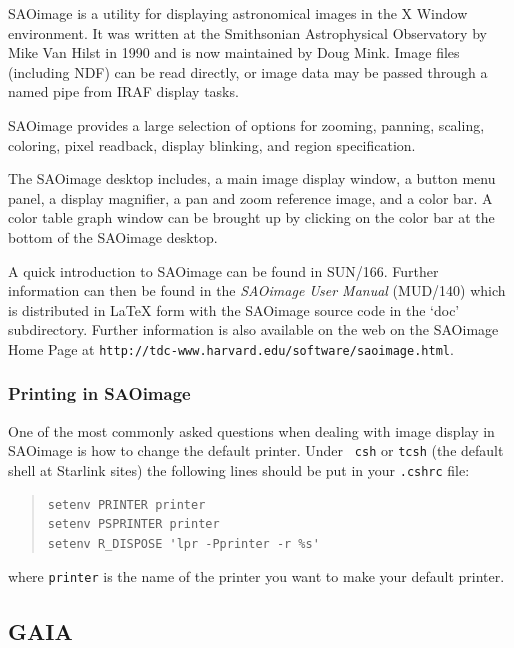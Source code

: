 \documentclass[twoside,11pt]{article}
\newcommand{\htmladdnormallink}[2]{#1}
\newcommand{\latex}[1]{#1}
\newcommand{\xref}[3]{#1}
\newcommand{\xlabel}[1]{}
\begin{document}
\htmladdnormallink{SAOimage}{http://tdc-www.harvard.edu/software/saoimage.html}
is a utility for displaying astronomical images in the X Window
environment. It was written at the Smithsonian Astrophysical
Observatory by Mike Van Hilst in 1990 and is now maintained by Doug
Mink. Image files (including \xref{NDF}{sun33}{}) can be read
directly, or image data may be passed through a named pipe from IRAF
display tasks. 

SAOimage provides a large selection of options for zooming, panning,
scaling, coloring, pixel readback, display blinking, and region
specification. 

The SAOimage desktop includes, a main image display window, a button
menu panel, a display magnifier, a pan and zoom reference image, and a
color bar. A color table graph window can be brought up by clicking on
the color bar at the bottom of the SAOimage desktop.

A quick introduction to SAOimage can be found in
\xref{SUN/166}{sun166}{}. Further information can then be found in the
{\em SAOimage User Manual} (MUD/140) which is distributed in LaTeX
form with the SAOimage source code in the `doc' subdirectory. Further
information is also available on the web on the
\htmladdnormallink{SAOimage Home
Page}{http://tdc-www.harvard.edu/software/saoimage.html}\latex{ at
{\tt http://tdc-www.harvard.edu/software/saoimage.html}}.

\subsubsection{Printing in SAOimage}

One of the most commonly asked questions when dealing with image
display in SAOimage is how to change the default printer. Under {\tt
csh} or {\tt tcsh} (the default shell at Starlink sites) the following
lines should be put in your {\tt .cshrc} file:

\small
\begin{quote}
\begin{verbatim}
setenv PRINTER printer
setenv PSPRINTER printer
setenv R_DISPOSE 'lpr -Pprinter -r %s'
\end{verbatim}
\end{quote}
\normalsize

where \verb+printer+ is the name of the printer you want to make your default printer.

\subsection{\xlabel{sc15_gaia}GAIA\label{sc15_gaia}}
\end{document}
